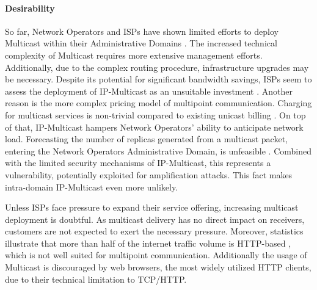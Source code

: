\paragraph{Desirability} %
\label{par:Desirability}


So far, Network Operators and ISPs have shown limited efforts to deploy
    Multicast within their Administrative Domains
    \cite{diot2000deployment, ratnasamy2006revisiting}.
The increased technical complexity of Multicast requires more extensive
    management efforts.
Additionally, due to the complex routing procedure, infrastructure upgrades may
    be necessary.
Despite its potential for significant bandwidth savings, ISPs seem to assess
    the deployment of IP-Multicast as an unsuitable investment
    \cite{ratnasamy2006revisiting}.
Another reason is the more complex pricing model of multipoint communication.
Charging for multicast services is non-trivial compared to existing unicast
    billing \cite{ratnasamy2006revisiting}.
On top of that, IP-Multicast hampers Network Operators' ability to anticipate
    network load.
Forecasting the number of replicas generated from a multicast packet, entering
    the Network Operators Administrative Domain, is unfeasible
    \cite{diot2000deployment}.
Combined with the limited security mechanisms of IP-Multicast, this represents
    a vulnerability, potentially exploited for amplification attacks.
This fact makes intra-domain IP-Multicast even more unlikely.

Unless ISPs face pressure to expand their service offering, increasing
    multicast deployment is doubtful.
As multicast delivery has no direct impact on receivers, customers are not 
    expected to exert the necessary pressure.
Moreover, statistics illustrate that more than half of the internet traffic
    volume is HTTP-based \cite{cloudflare2023radar}, which is not well suited
    for multipoint communication.
Additionally the usage of Multicast is discouraged by web browsers, the most 
    widely utilized HTTP clients, due to their technical limitation to
    TCP/HTTP\footnotemark.

